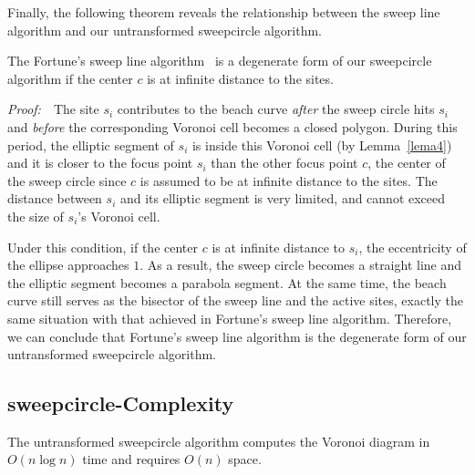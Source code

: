 {{%


Finally, the following theorem reveals the relationship between the
sweep line algorithm and our untransformed sweepcircle algorithm.
\vspace{0.1in}
\begin{theorem}\label{thm1}
The Fortune's sweep line
algorithm~\cite{Fortune1986} is a degenerate form of our sweepcircle algorithm if the center $c$ is at infinite distance to the
sites.
\end{theorem}
\vspace{0.1in}\noindent\textit{Proof:}~~The site $s_i$ contributes
to the beach curve \textit{after} the sweep circle hits $s_i$ and
\textit{before} the corresponding Voronoi cell becomes a closed
polygon. During this period, the elliptic segment of $s_i$ is inside
this Voronoi cell (by Lemma~\ref{lema4}) and it is closer to the
focus point $s_i$ than the other focus point $c$, the center of the
sweep circle since $c$ is assumed to be at infinite distance to the
sites. The distance between $s_i$ and its elliptic segment is very limited, and cannot exceed the size of $s_i$'s Voronoi cell.

Under this condition, if the center $c$ is at infinite distance to $s_i$, the eccentricity
of the ellipse approaches $1$. As a result, the sweep circle becomes
a straight line and the elliptic segment becomes a parabola segment.
At the same time, the beach curve still serves as the bisector of the sweep line and
the active sites, exactly the same situation with that achieved in Fortune's sweep line algorithm. Therefore, we can conclude that Fortune's sweep line algorithm is the
degenerate form of our untransformed sweepcircle algorithm. %


\subsection{sweepcircle-Complexity}
\label{subsec:sweepcircle-complexity}

\begin{theorem}\label{thm3}
The untransformed sweepcircle algorithm computes the Voronoi diagram in $O(n\log
n)$ time and requires $O(n)$ space.
\end{theorem}

}}
